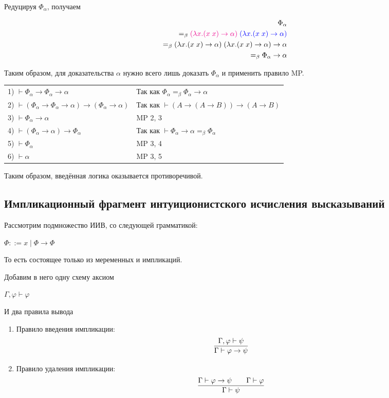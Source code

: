 Редуцируя $\Phi_{\alpha}$, получаем 

\begin{align*}
\Phi_{\alpha} \\ =_{\beta} \textcolor{magenta}{(\lambda x. (x \; x) \rightarrow \alpha)} \; \textcolor{blue}{(\lambda x. (x \; x) \rightarrow \alpha)} \\=_{\beta} (\lambda x. (x \; x) \rightarrow \alpha) \; (\lambda x. (x \; x) \rightarrow \alpha) \rightarrow \alpha \\=_{\beta} \Phi_{\alpha} \rightarrow \alpha
\end{align*}

Таким образом, для доказательства $\alpha$ нужно всего лишь доказать $\Phi_{\alpha}$ и применить правило MP.

\begin{tabular}{ll}
	1) $\vdash\Phi_\alpha\rightarrow\Phi_\alpha\rightarrow\alpha$ & Так как $\Phi_{\alpha} =_{\beta} \Phi_{\alpha} \rightarrow \alpha$\\
	2) $\vdash(\Phi_\alpha\rightarrow\Phi_\alpha\rightarrow\alpha)\rightarrow(\Phi_\alpha\rightarrow\alpha)$ & Так как $\vdash (A \rightarrow (A \rightarrow B)) \rightarrow (A \rightarrow B)$\\
	3) $\vdash\Phi_\alpha\rightarrow\alpha$ & MP 2, 3\\
	4) $\vdash (\Phi_\alpha \rightarrow \alpha) \rightarrow \Phi_\alpha$ & Так как $\vdash \Phi_\alpha \rightarrow \alpha =_{\beta} \Phi_\alpha$\\
	5) $\vdash\Phi_\alpha$ & MP 3, 4\\
	6) $\vdash\alpha$ & MP 3, 5
\end{tabular}

Таким образом, введённая логика оказывается противоречивой.

\subsection{Импликационный фрагмент интуиционистского исчисления высказываний}

Рассмотрим подмножество ИИВ, со следующей грамматикой:

$\Phi ::= x \; | \; \Phi \rightarrow \Phi$

То есть состоящее только из меременных и импликаций. 

Добавим в него одну схему аксиом

$\Gamma, \varphi \vdash \varphi$

И два правила вывода

\begin{enumerate}
	\item Правило введения импликации:
	\[
	\infer{\Gamma \vdash \varphi \to \psi}{\Gamma, \varphi \vdash \psi}
	\]
	\item Правило удаления импликации:
	\[
	\infer{\Gamma \vdash \psi}{\Gamma \vdash \varphi \to \psi && \Gamma \vdash \varphi}
	\]
\end{enumerate}
